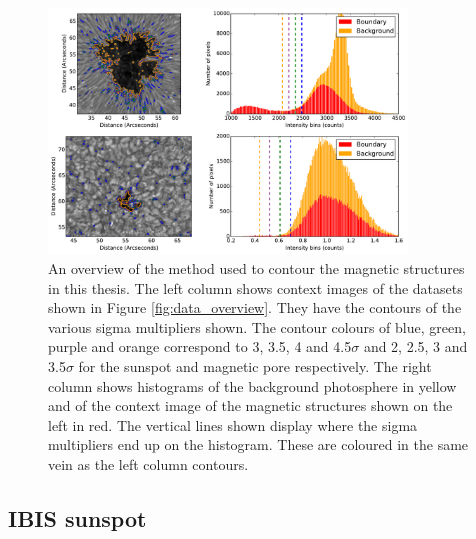     \begin{figure}
        \centering
        \includegraphics[width=0.85\textwidth]{method_overview.pdf}
        \caption{
                An overview of the method used to contour the magnetic structures in this thesis.
                The left column shows context images of the datasets shown in Figure \ref{fig:data_overview}.
                They have the contours of the various sigma multipliers shown.
                The contour colours of blue, green, purple and orange correspond to 3, 3.5, 4 and 4.5$\sigma$ and 2, 2.5, 3 and 3.5$\sigma$ for the sunspot and magnetic pore respectively.
                The right column shows histograms of the background photosphere in yellow and of the context image of the magnetic structures shown on the left in red.
                The vertical lines shown display where the sigma multipliers end up on the histogram.
                These are coloured in the same vein as the left column contours.
                }
        \label{fig:method_overview}
    \end{figure}
    
    \subsection{IBIS sunspot}
    
